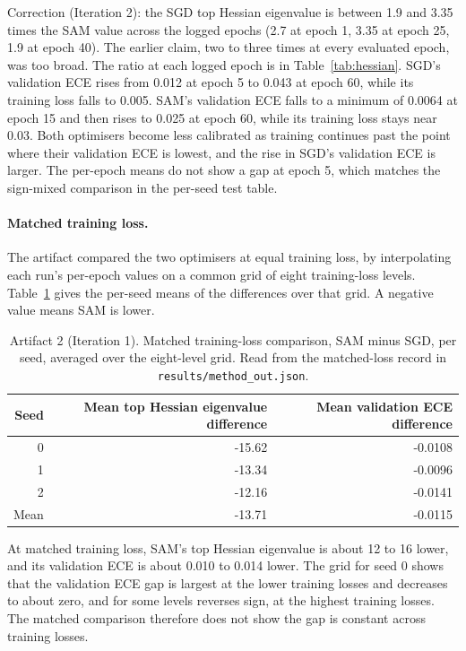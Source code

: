 \documentclass[11pt,letterpaper]{article}
\begin{document}
Correction (Iteration 2): the SGD top Hessian eigenvalue is between 1.9 and 3.35 times the SAM value across the logged epochs (2.7 at epoch 1, 3.35 at epoch 25, 1.9 at epoch 40). The earlier claim, two to three times at every evaluated epoch, was too broad. The ratio at each logged epoch is in Table~\ref{tab:hessian}. SGD's validation ECE rises from 0.012 at epoch 5 to 0.043 at epoch 60, while its training loss falls to 0.005. SAM's validation ECE falls to a minimum of 0.0064 at epoch 15 and then rises to 0.025 at epoch 60, while its training loss stays near 0.03. Both optimisers become less calibrated as training continues past the point where their validation ECE is lowest, and the rise in SGD's validation ECE is larger. The per-epoch means do not show a gap at epoch 5, which matches the sign-mixed comparison in the per-seed test table.

\paragraph{Matched training loss.} The artifact compared the two optimisers at equal training loss, by interpolating each run's per-epoch values on a common grid of eight training-loss levels. Table~\ref{tab:matchA} gives the per-seed means of the differences over that grid. A negative value means SAM is lower.

\begin{table}[!htbp]
\centering
\footnotesize
\caption{Artifact 2 (Iteration 1). Matched training-loss comparison, SAM minus SGD, per seed, averaged over the eight-level grid. Read from the matched-loss record in \texttt{results/method\_out.json}.}
\label{tab:matchA}
\begin{tabular}{rrr}
\toprule
Seed & Mean top Hessian eigenvalue difference & Mean validation ECE difference \\
\midrule
0 & -15.62 & -0.0108 \\
1 & -13.34 & -0.0096 \\
2 & -12.16 & -0.0141 \\
Mean & -13.71 & -0.0115 \\
\bottomrule
\end{tabular}
\end{table}

At matched training loss, SAM's top Hessian eigenvalue is about 12 to 16 lower, and its validation ECE is about 0.010 to 0.014 lower. The grid for seed 0 shows that the validation ECE gap is largest at the lower training losses and decreases to about zero, and for some levels reverses sign, at the highest training losses. The matched comparison therefore does not show the gap is constant across training losses.
\end{document}
